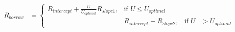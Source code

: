 \documentclass[preview]{standalone}
\begin{document}
\begin{align*}
\begin{equation}\begin{aligned} R _{borrow} &= \begin{cases}  R _{intercept} + \frac{U}{U_{optimal}} R _{slope1}, & \text{if } U \leq U_{optimal} \\ & R _{intercept} +  R _{slope2}, & \text{if } U &> U_{optimal} \end{cases}\end{aligned}\end{equation}
\end{align*}
\end{document}
